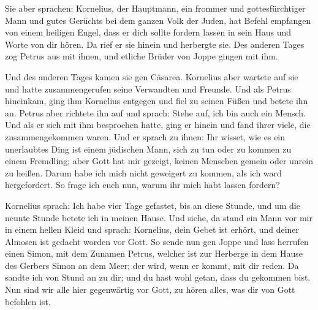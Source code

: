  Sie aber sprachen: Kornelius, der Hauptmann, ein frommer
und gottesfürchtiger Mann und gutes Gerüchts bei dem ganzen Volk der
Juden, hat Befehl empfangen von einem heiligen Engel, dass er dich
sollte fordern lassen in sein Haus und Worte von dir hören.
 Da rief er sie hinein und herbergte sie. Des anderen
Tages zog Petrus aus mit ihnen, und etliche Brüder von Joppe gingen mit
ihm.

 Und des anderen Tages kamen sie gen Cäsarea. Kornelius
aber wartete auf sie und hatte zusammengerufen seine Verwandten und
Freunde.  Und als Petrus hineinkam, ging ihm Kornelius
entgegen und fiel zu seinen Füßen und betete ihn an. 
Petrus aber richtete ihn auf und sprach: Stehe auf, ich bin auch ein
Mensch.  Und als er sich mit ihm besprochen hatte, ging
er hinein und fand ihrer viele, die zusammengekommen waren.
 Und er sprach zu ihnen: Ihr wisset, wie es ein
unerlaubtes Ding ist einem jüdischen Mann, sich zu tun oder zu kommen zu
einem Fremdling; aber Gott hat mir gezeigt, keinen Menschen gemein oder
unrein zu heißen.  Darum habe ich mich nicht geweigert zu
kommen, als ich ward hergefordert. So frage ich euch nun, warum ihr mich
habt lassen fordern?

 Kornelius sprach: Ich habe vier Tage gefastet, bis an
diese Stunde, und um die neunte Stunde betete ich in meinen Hause. Und
siehe, da stand ein Mann vor mir in einem hellen Kleid 
und sprach: Kornelius, dein Gebet ist erhört, und deiner Almosen ist
gedacht worden vor Gott.  So sende nun gen Joppe und lass
herrufen einen Simon, mit dem Zunamen Petrus, welcher ist zur Herberge
in dem Hause des Gerbers Simon an dem Meer; der wird, wenn er kommt, mit
dir reden.  Da sandte ich von Stund an zu dir; und du
hast wohl getan, dass du gekommen bist. Nun sind wir alle hier
gegenwärtig vor Gott, zu hören alles, was dir von Gott befohlen ist.

